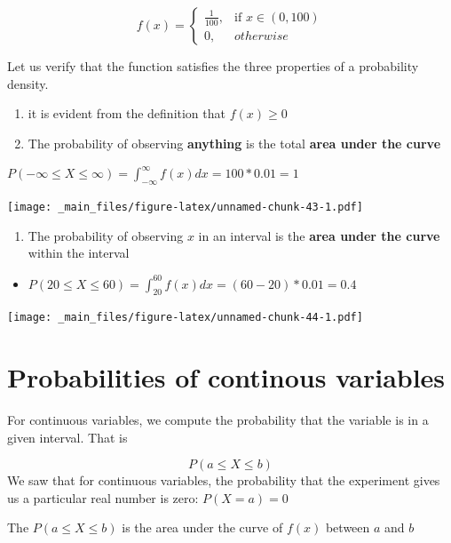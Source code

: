 \documentclass[
]{book}
\providecommand{\tightlist}{%
  \setlength{\itemsep}{0pt}\setlength{\parskip}{0pt}}
\begin{document}
\[
    f(x)= 
\begin{cases}
    \frac{1}{100},& \text{if } x\in (0,100)\\
    0,& otherwise 
\end{cases}
\]

Let us verify that the function satisfies the three properties of a probability density.

\begin{enumerate}
\def\labelenumi{\arabic{enumi})}
\item
  it is evident from the definition that \(f(x) \geq 0\)
\item
  The probability of observing \textbf{anything} is the total \textbf{area under the curve}
\end{enumerate}

\(P(-\infty\leq X \leq \infty)= \int_{-\infty}^{\infty} f(x) dx = 100*0.01= 1\)

\texttt{[image: \_main\_files/figure-latex/unnamed-chunk-43-1.pdf]}

\begin{enumerate}
\def\labelenumi{\arabic{enumi})}
\setcounter{enumi}{2}
\tightlist
\item
  The probability of observing \(x\) in an interval is the \textbf{area under the curve} within the interval
\end{enumerate}

\begin{itemize}
\tightlist
\item
  \(P(20 \leq X \leq 60) = \int_{20}^{60} f(x) dx = (60-20)*0.01=0.4\)
\end{itemize}

\texttt{[image: \_main\_files/figure-latex/unnamed-chunk-44-1.pdf]}

\hypertarget{probabilities-of-continous-variables}{%
\section{Probabilities of continous variables}\label{probabilities-of-continous-variables}}

For continuous variables, we compute the probability that the variable is in a given interval. That is

\[P(a \leq X \leq b)\]
We saw that for continuous variables, the probability that the experiment gives us a particular real number is zero: \(P(X=a)=0\)

The \(P(a \leq X \leq b)\) is the area under the curve of \(f(x)\) between \(a\) and \(b\)
\end{document}
